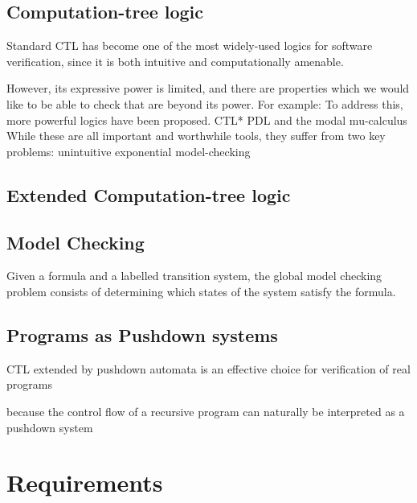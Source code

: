 \documentclass[11pt]{article}
\begin{document}
\subsection{Computation-tree logic}

Standard CTL has become %
one of the most widely-used logics for software verification, since it is both intuitive and computationally amenable.




However, its expressive power is limited, and there are properties which we would like to be able to check that are beyond its power.
For example: 
To address this, more powerful logics have been proposed. CTL* %
 PDL %
and the modal mu-calculus
While these are all important and worthwhile tools, they suffer from two key problems: 
unintuitive
exponential model-checking




\subsection{Extended Computation-tree logic}






\cite{Kreutzer10}

\subsection{Model Checking}

Given a formula and a labelled transition system, the global model checking
problem consists of determining which states of the system satisfy the formula.


\subsection{Programs as Pushdown systems}

CTL extended by pushdown automata is an effective choice for verification of real programs

because the control flow of a recursive program can naturally be 
interpreted
as a pushdown system

\section{Requirements}
\end{document}
